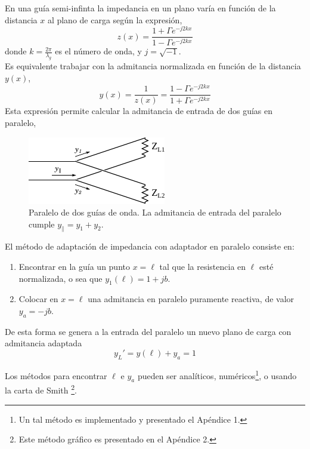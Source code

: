 \documentclass[11pt,a4paper]{article}
\begin{document}
\begin{multicols}{2}
En una guía semi-infinta la impedancia en un plano varía en función de la distancia $x$ al plano de carga según la expresión,
\begin{equation}
    z(x) = \frac{1 + \Gamma e^{-j2kx}}{1 - \Gamma e^{-j2kx}}
\end{equation}
donde $k=\frac{2\pi}{\lambda_g}$ es el número de onda, y $j=\sqrt{-1}$.\cite{cheng_9} \\

Es equivalente trabajar con la admitancia normalizada en función de la distancia $y(x)$,
\begin{equation}
    y(x) = \frac{1}{z(x)} = \frac{1 - \Gamma e^{-j2kx}}{1 + \Gamma e^{-j2kx}}
\end{equation}
Esta expresión permite calcular la admitancia de entrada de dos guías en paralelo,
\begin{figure}[H]
    \centering
    \includegraphics[width=0.6\linewidth]{Images/guiapll.pdf}
    \caption{Paralelo de dos guías de onda. La admitancia de entrada del paralelo cumple $y_\parallel = y_1+y_2$.}
    \label{fig:pll}
\end{figure}

El método de adaptación de impedancia con adaptador en paralelo consiste en:
\begin{enumerate}
    \item Encontrar en la guía un punto $x = \ell$ tal que la resistencia en $\ell$ esté normalizada, o sea que $y_1(\ell)=1+jb$.
    \item Colocar en $x=\ell$ una admitancia en paralelo puramente reactiva, de valor $y_a = -jb$.
\end{enumerate}

De esta forma se genera a la entrada del paralelo un nuevo plano de carga con admitancia adaptada 
$$y_L' = y(\ell) + y_a = 1$$

Los métodos para encontrar $\ell$ e $y_a$ pueden ser analíticos, numéricos\footnote{Un tal método es implementado y presentado el Apéndice 1.}, o usando la carta de Smith \footnote{Este método gráfico es presentado en el Apéndice 2.\cite{smith_1969}}.\\


\end{multicols}
\end{document}
